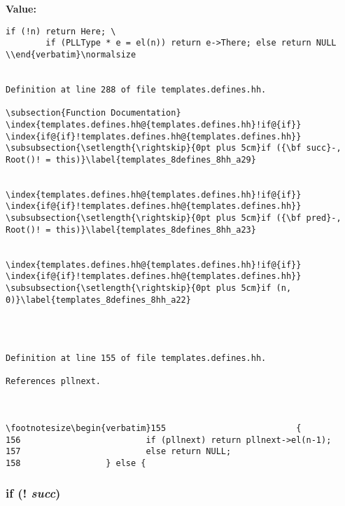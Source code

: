 {\bf Value:}

\footnotesize\begin{verbatim}if (!n) return Here; \
        if (PLLType * e = el(n)) return e->There; else return NULL \\end{verbatim}\normalsize 


Definition at line 288 of file templates.defines.hh.

\subsection{Function Documentation}
\index{templates.defines.hh@{templates.defines.hh}!if@{if}}
\index{if@{if}!templates.defines.hh@{templates.defines.hh}}
\subsubsection{\setlength{\rightskip}{0pt plus 5cm}if ({\bf succ}-, Root()! = this)}\label{templates_8defines_8hh_a29}


\index{templates.defines.hh@{templates.defines.hh}!if@{if}}
\index{if@{if}!templates.defines.hh@{templates.defines.hh}}
\subsubsection{\setlength{\rightskip}{0pt plus 5cm}if ({\bf pred}-, Root()! = this)}\label{templates_8defines_8hh_a23}


\index{templates.defines.hh@{templates.defines.hh}!if@{if}}
\index{if@{if}!templates.defines.hh@{templates.defines.hh}}
\subsubsection{\setlength{\rightskip}{0pt plus 5cm}if (n, 0)}\label{templates_8defines_8hh_a22}




Definition at line 155 of file templates.defines.hh.

References pllnext.



\footnotesize\begin{verbatim}155                          { 
156                         if (pllnext) return pllnext->el(n-1); 
157                         else return NULL; 
158                 } else { 
\end{verbatim}\normalsize 
{}
\subsubsection{\setlength{\rightskip}{0pt plus 5cm}if (! {\em succ})\hspace{0.3cm}{\tt  [inline]}}\label{templates_8defines_8hh_a18}




